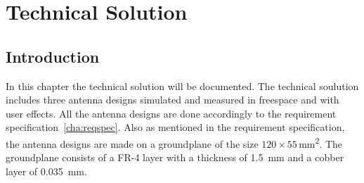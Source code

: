 \chapter{Technical Solution}
\section{Introduction}
In this chapter the technical solution will be documented. The technical soulution includes three antenna designs simulated and measured in freespace and with user effects. All the antenna designs are done accordingly to the requirement specification~\ref{cha:reqspec}. Also as mentioned in the requirement specification, the antenna designs are made on a groundplane of the size $120\times55$\,\si{mm\squared}. The groundplane consists of a FR-4 layer with a thickness of \SI{1.5}{mm} and a cobber layer of \SI{0.035}{mm}.